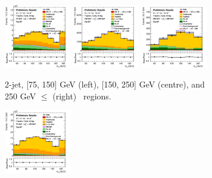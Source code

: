 \vspace*{\fill} \newpage
\vspace*{\fill} 

\begin{figure}[h!]
    \centering
    \begin{subfigure}[b]{\textwidth}
        \centering
        \includegraphics[width=0.32\textwidth]{Images/VH/Own_fit/postfit_VHcc/Region_distmBB_BMax150_BMin75_DtopCRBC_J2_TTypebt_T1_L1_Y6051_GlobalFit_conditionnal_mu1.png}
        \includegraphics[width=0.32\textwidth]{Images/VH/Own_fit/postfit_VHcc/Region_distmBB_BMax250_BMin150_DtopCRBC_J2_TTypebt_T1_L1_Y6051_GlobalFit_conditionnal_mu1.png}
        \includegraphics[width=0.32\textwidth]{Images/VH/Own_fit/postfit_VHcc/Region_distmBB_BMax400_BMin250_DtopCRBC_J2_TTypebt_T1_L1_Y6051_GlobalFit_conditionnal_mu1.png}
        \caption{2-jet, [75, 150] GeV (left), [150, 250] GeV (centre), and 250 GeV $\leq$ (right) \ptv\ regions.}
        \label{fig:plots_VHcc_1L_TopCR_2J}
    \end{subfigure}
    \begin{subfigure}[b]{\textwidth}
        \centering
        \includegraphics[width=0.32\textwidth]{Images/VH/Own_fit/postfit_VHcc/Region_distmBB_BMax150_BMin75_DtopCRBC_J3_TTypebt_T1_L1_Y6051_GlobalFit_conditionnal_mu1.png}

\end{subfigure}
\end{figure}

